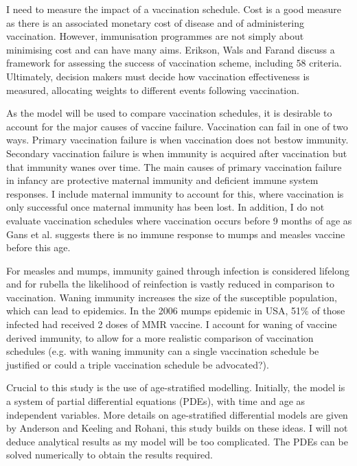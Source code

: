 \documentclass[a4paper,11pt] {scrartcl}
\begin{document}
I need to measure the impact of a vaccination schedule. Cost is a good measure as there is an associated monetary cost of disease and of administering vaccination. However, immunisation programmes are not simply about minimising cost and can have many aims. Erikson, Wals and Farand\cite{erickson2005analytical} discuss a framework for assessing the success of vaccination scheme, including 58 criteria. Ultimately, decision makers must decide how vaccination effectiveness is measured, allocating weights to different events following vaccination. 

As the model will be used to compare vaccination schedules, it is desirable to  account for the major causes of vaccine failure. Vaccination can fail in one of two ways. Primary vaccination failure is when vaccination does not bestow immunity. Secondary vaccination failure is when immunity is acquired after vaccination but that immunity wanes over time. The main causes of primary vaccination failure in infancy are protective maternal immunity and deficient immune system responses\cite{gans2003measles,glezen2003effect}. I include maternal immunity to account for this, where vaccination is only successful once maternal immunity has been lost. In addition, I do not evaluate vaccination schedules where vaccination occurs before 9 months of age as Gans et al.\cite{gans2003measles} suggests there is no immune response to mumps and measles vaccine before this age.

For measles and mumps, immunity gained through infection is considered lifelong\cite{naniche2009human,hviid2008mumps} and for rubella the likelihood of reinfection is vastly reduced in comparison to vaccination\cite{miller1990rubella}. Waning immunity increases the size of the susceptible population, which can lead to epidemics. In the 2006 mumps epidemic in USA, 51\% of those infected had received 2 doses of MMR vaccine\cite{baum2008cares}. I account for waning of vaccine derived immunity, to allow for a more realistic comparison of vaccination schedules (e.g. with waning immunity can a single vaccination schedule be justified or could a triple vaccination schedule be advocated?).

Crucial to this study is the use of age-stratified modelling. Initially, the model is a system of partial differential equations (PDEs), with time and age as independent variables. More details on age-stratified differential models are given by Anderson\cite{anderson1985age} and Keeling and Rohani\cite{keeling2011modeling}, this study builds on these ideas. I will not deduce analytical results as my model will be too complicated. The PDEs can be solved numerically to obtain the results required.
\end{document}
